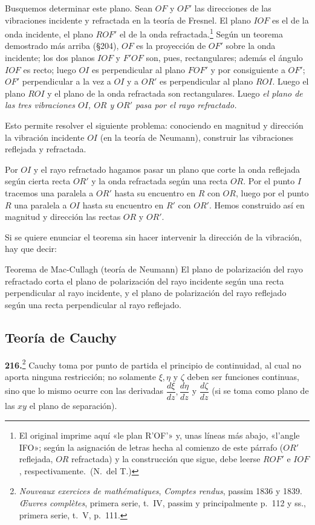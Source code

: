 Busquemos determinar este plano. Sean $OF$ y $OF'$ las direcciones de las
vibraciones incidente y refractada en la teoría de Fresnel. El plano
$IOF$ es el de la onda incidente, el plano $ROF'$ el de la onda
refractada.\footnote{El original imprime aquí «le plan R'OF'» y, unas
líneas más abajo, «l'angle IFO»; según la asignación de letras hecha al
comienzo de este párrafo ($OR'$ reflejada, $OR$ refractada) y la
construcción que sigue, debe leerse $ROF'$ e $IOF$, respectivamente.~(N.~del T.)}
Según un teorema demostrado más arriba (§204), $OF$ es la
proyección de $OF'$ sobre la onda incidente; los dos planos $IOF$ y
$F'OF$ son, pues, rectangulares; además el ángulo $IOF$ es recto; luego
$OI$ es perpendicular al plano $FOF'$ y por consiguiente a $OF'$; $OF'$
perpendicular a la vez a $OI$ y a $OR'$ es perpendicular al plano $ROI$.
Luego el plano $ROI$ y el plano de la onda refractada son rectangulares.
Luego \emph{el plano de las tres vibraciones $OI$, $OR$ y $OR'$ pasa por
el rayo refractado.}

Esto permite resolver el siguiente problema: conociendo en magnitud y
dirección la vibración incidente $OI$ (en la teoría de Neumann),
construir las vibraciones reflejada y refractada.

Por $OI$ y el rayo refractado hagamos pasar un plano que corte la onda
reflejada según cierta recta $OR'$ y la onda refractada según una recta
$OR$. Por el punto $I$ tracemos una paralela a $OR'$ hasta su encuentro en
$R$ con $OR$, luego por el punto $R$ una paralela a $OI$ hasta su
encuentro en $R'$ con $OR'$. Hemos construido así en magnitud y dirección
las rectas $OR$ y $OR'$.

Si se quiere enunciar el teorema sin hacer intervenir la dirección de la
vibración, hay que decir:

\begin{enunciado}{Teorema de Mac-Cullagh (teoría de Neumann)}
El plano de polarización del rayo refractado corta el plano de
polarización del rayo incidente según una recta perpendicular al rayo
incidente, y el plano de polarización del rayo reflejado según una recta
perpendicular al rayo reflejado.
\end{enunciado}

\subsection{Teoría de Cauchy}
\label{sec:reflexion-cauchy}

\noindent\textbf{216.}\footnote{\emph{Nouveaux
exercices de mathématiques}, \emph{Comptes rendus}, passim 1836 y 1839.
\emph{Œuvres complètes}, primera serie, t.~IV, passim y principalmente
p.~112 y ss., primera serie, t.~V, p.~111.} Cauchy toma por punto de
partida el principio de continuidad, al cual no aporta ninguna
restricción; no solamente $\xi,\eta$ y $\zeta$ deben ser funciones
continuas, sino que lo mismo ocurre con las derivadas
$\dfrac{d\xi}{dz},\dfrac{d\eta}{dz}$ y $\dfrac{d\zeta}{dz}$ (si se toma
como plano de las $xy$ el plano de separación).

